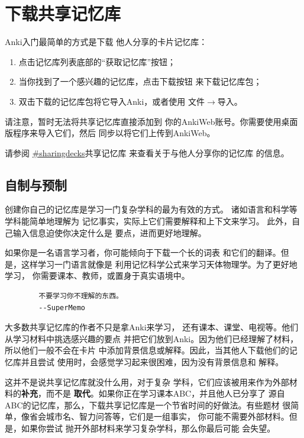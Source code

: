 \documentclass[a4paper]{book}
\begin{document}
	\section{下载共享记忆库}
	
	Anki入门最简单的方式是下载 他人分享的卡片记忆库：
	
	\begin{enumerate}
		\itemsep1pt\parskip0pt
		\item 点击记忆库列表底部的“获取记忆库”按钮；
		\item 当你找到了一个感兴趣的记忆库，点击下载按钮 来下载记忆库包；
		\item 双击下载的记忆库包将它导入Anki，或者使用 文件$\to$导入。
	\end{enumerate}
	
	请注意，暂时无法将共享记忆库直接添加到 你的AnkiWeb账号。你需要使用桌面版程序来导入它们，然后 同步以将它们上传到AnkiWeb。
	
	请参阅 \url{#sharingdecks}共享记忆库 来查看关于与他人分享你的记忆库 的信息。
	
	\subsection{自制与预制}
	
	创建你自己的记忆库是学习一门复杂学科的最为有效的方式。 诸如语言和科学等学科能简单地理解为 记忆事实，实际上它们需要解释和上下文来学习。 此外，自己输入信息迫使你决定什么是 要点，进而更好地理解。
	
	如果你是一名语言学习者，你可能倾向于下载一个长的词表 和它们的翻译。但是，这样学习一门语言就像是 利用记忆科学公式来学习天体物理学。为了更好地学习， 你需要课本、教师，或置身于真实语境中。
	
	\begin{shaded}\begin{verbatim}
		不要学习你不理解的东西。
		--SuperMemo
		\end{verbatim}\end{shaded}
	
	大多数共享记忆库的作者不只是拿Anki来学习， 还有课本、课堂、电视等。他们从学习材料中挑选感兴趣的要点 并把它们放到Anki。因为他们已经理解了材料，所以他们一般不会在卡片 中添加背景信息或解释。因此，当其他人下载他们的记忆库并且尝试 使用时，会感觉学习起来很困难，因为没有背景信息和 解释。
	
	这并不是说共享记忆库就没什么用，对于复杂 学科，它们应该被用来作为外部材料的\textbf{补充}，而不是 \textbf{取代}。如果你正在学习课本ABC，并且他人已分享了 源自ABC的记忆库，那么，下载共享记忆库是一个节省时间的好做法。有些题材 很简单，像省会城市名、智力问答等，它们是一组事实， 你可能不需要外部材料。但是，如果你尝试 抛开外部材料来学习复杂学科，那么你最后可能 会失望。
	
\end{document}
